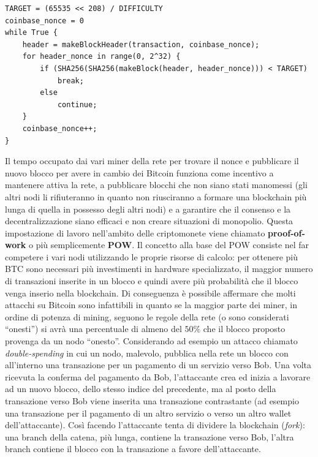 \begin{lstlisting}[caption=Pseudocodice dell'algoritmo di mining per Hashcash]
TARGET = (65535 << 208) / DIFFICULTY
coinbase_nonce = 0
while True {
    header = makeBlockHeader(transaction, coinbase_nonce);
    for header_nonce in range(0, 2^32) {
        if (SHA256(SHA256(makeBlock(header, header_nonce))) < TARGET)
            break;
        else
            continue;
    }
    coinbase_nonce++;
}
\end{lstlisting}
Il tempo occupato dai vari miner della rete per trovare il nonce e pubblicare il nuovo blocco per avere in cambio dei Bitcoin funziona come incentivo a mantenere attiva la rete, a pubblicare blocchi che non siano stati manomessi (gli altri nodi li rifiuteranno in quanto non riusciranno a formare una blockchain più lunga di quella in possesso degli altri nodi) e a garantire che il consenso e la decentralizzazione siano efficaci e non creare situazioni di monopolio. Questa impostazione di lavoro nell'ambito delle criptomonete viene chiamato \textbf{proof-of-work} o più semplicemente \textbf{POW}. Il concetto alla base del POW consiste nel far competere i vari nodi utilizzando le proprie risorse di calcolo: per ottenere più BTC sono necessari più investimenti in hardware specializzato, il maggior numero di transazioni inserite in un blocco e quindi avere più probabilità che il blocco venga inserio nella blockchain. Di conseguenza è possibile affermare che molti attacchi su Bitcoin sono infattibili in quanto se la maggior parte dei miner, in ordine di potenza di mining, seguono le regole della rete (o sono considerati ``onesti'') si avrà una percentuale di almeno del $50\%$ che il blocco proposto provenga da un nodo ``onesto''.\newnline\newline
Considerando ad esempio un attacco chiamato \textit{double-spending} in cui un nodo, malevolo, pubblica nella rete un blocco con all'interno una transazione per un pagamento di un servizio verso Bob. Una volta ricevuta la conferma del pagamento da Bob, l'attaccante crea ed inizia a lavorare ad un nuovo blocco, dello stesso indice del precedente, ma al posto della transazione verso Bob viene inserita una transazione contrastante (ad esempio una transazione per il pagamento di un altro servizio o verso un altro wallet dell'attaccante). Così facendo l'attaccante tenta di dividere la blockchain (\textit{fork}): una branch della catena, più lunga, contiene la transazione verso Bob, l'altra branch contiene il blocco con la transazione a favore dell'attaccante.\newline
